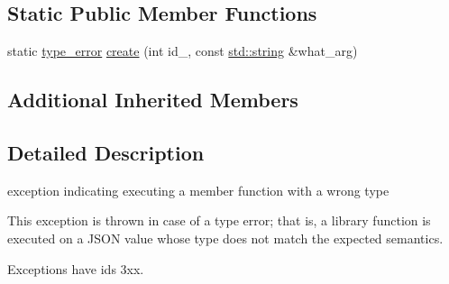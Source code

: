 \subsection*{Static Public Member Functions}
\begin{DoxyCompactItemize}
\item 
static \hyperlink{classnlohmann_1_1detail_1_1type__error}{type\+\_\+error} \hyperlink{classnlohmann_1_1detail_1_1type__error_aecc083aea4b698c33d042670ba50c10f}{create} (int id\+\_\+, const \hyperlink{namespacenlohmann_1_1detail_a90aa5ef615aa8305e9ea20d8a947980fab45cffe084dd3d20d928bee85e7b0f21}{std\+::string} \&what\+\_\+arg)
\end{DoxyCompactItemize}
\subsection*{Additional Inherited Members}


\subsection{Detailed Description}
exception indicating executing a member function with a wrong type 

This exception is thrown in case of a type error; that is, a library function is executed on a J\+S\+ON value whose type does not match the expected semantics.

Exceptions have ids 3xx.

